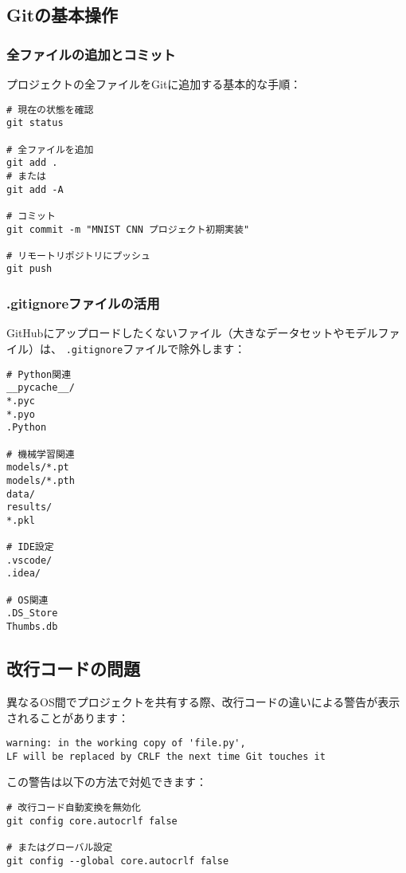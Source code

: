 \documentclass{ltjsarticle}      %
\begin{document}
\subsection{Gitの基本操作}

\subsubsection{全ファイルの追加とコミット}
プロジェクトの全ファイルをGitに追加する基本的な手順：

\begin{lstlisting}
# 現在の状態を確認
git status

# 全ファイルを追加
git add .
# または
git add -A

# コミット
git commit -m "MNIST CNN プロジェクト初期実装"

# リモートリポジトリにプッシュ
git push
\end{lstlisting}

\subsubsection{.gitignoreファイルの活用}
GitHubにアップロードしたくないファイル（大きなデータセットやモデルファイル）は、
\texttt{.gitignore}ファイルで除外します：

\begin{lstlisting}
# Python関連
__pycache__/
*.pyc
*.pyo
.Python

# 機械学習関連
models/*.pt
models/*.pth
data/
results/
*.pkl

# IDE設定
.vscode/
.idea/

# OS関連
.DS_Store
Thumbs.db
\end{lstlisting}

\subsection{改行コードの問題}
異なるOS間でプロジェクトを共有する際、改行コードの違いによる警告が表示されることがあります：

\begin{lstlisting}
warning: in the working copy of 'file.py', 
LF will be replaced by CRLF the next time Git touches it
\end{lstlisting}

この警告は以下の方法で対処できます：

\begin{lstlisting}
# 改行コード自動変換を無効化
git config core.autocrlf false

# またはグローバル設定
git config --global core.autocrlf false
\end{lstlisting}
\end{document}
